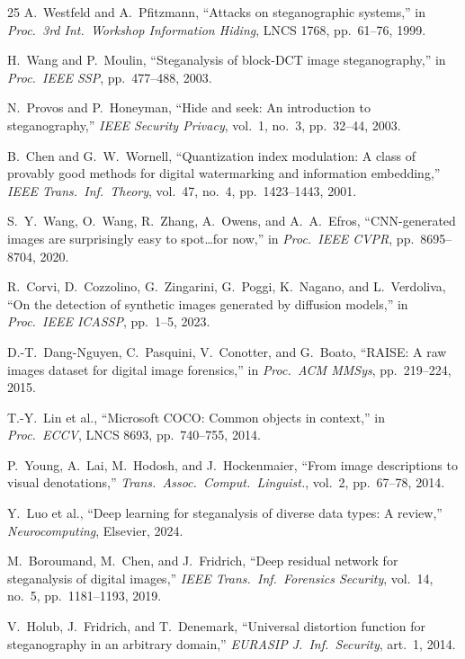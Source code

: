 \documentclass[10pt,twocolumn,a4paper]{article}
\begin{document}
\begin{thebibliography}{25}
A.~Westfeld and A.~Pfitzmann,
``Attacks on steganographic systems,''
in \textit{Proc.\ 3rd Int.\ Workshop Information Hiding}, LNCS 1768, pp.~61--76, 1999.

H.~Wang and P.~Moulin,
``Steganalysis of block-DCT image steganography,''
in \textit{Proc.\ IEEE SSP}, pp.~477--488, 2003.

N.~Provos and P.~Honeyman,
``Hide and seek: An introduction to steganography,''
\textit{IEEE Security Privacy}, vol.~1, no.~3, pp.~32--44, 2003.

B.~Chen and G.~W.~Wornell,
``Quantization index modulation: A class of provably good methods for digital watermarking and information embedding,''
\textit{IEEE Trans.\ Inf.\ Theory}, vol.~47, no.~4, pp.~1423--1443, 2001.

S.~Y.~Wang, O.~Wang, R.~Zhang, A.~Owens, and A.~A.~Efros,
``CNN-generated images are surprisingly easy to spot\ldots for now,''
in \textit{Proc.\ IEEE CVPR}, pp.~8695--8704, 2020.

R.~Corvi, D.~Cozzolino, G.~Zingarini, G.~Poggi, K.~Nagano, and L.~Verdoliva,
``On the detection of synthetic images generated by diffusion models,''
in \textit{Proc.\ IEEE ICASSP}, pp.~1--5, 2023.

D.-T.~Dang-Nguyen, C.~Pasquini, V.~Conotter, and G.~Boato,
``RAISE: A raw images dataset for digital image forensics,''
in \textit{Proc.\ ACM MMSys}, pp.~219--224, 2015.

T.-Y.~Lin et al.,
``Microsoft COCO: Common objects in context,''
in \textit{Proc.\ ECCV}, LNCS 8693, pp.~740--755, 2014.

P.~Young, A.~Lai, M.~Hodosh, and J.~Hockenmaier,
``From image descriptions to visual denotations,''
\textit{Trans.\ Assoc.\ Comput.\ Linguist.}, vol.~2, pp.~67--78, 2014.

Y.~Luo et al.,
``Deep learning for steganalysis of diverse data types: A review,''
\textit{Neurocomputing}, Elsevier, 2024.

M.~Boroumand, M.~Chen, and J.~Fridrich,
``Deep residual network for steganalysis of digital images,''
\textit{IEEE Trans.\ Inf.\ Forensics Security}, vol.~14, no.~5, pp.~1181--1193, 2019.

V.~Holub, J.~Fridrich, and T.~Denemark,
``Universal distortion function for steganography in an arbitrary domain,''
\textit{EURASIP J.\ Inf.\ Security}, art.~1, 2014.


\end{thebibliography}
\end{document}
